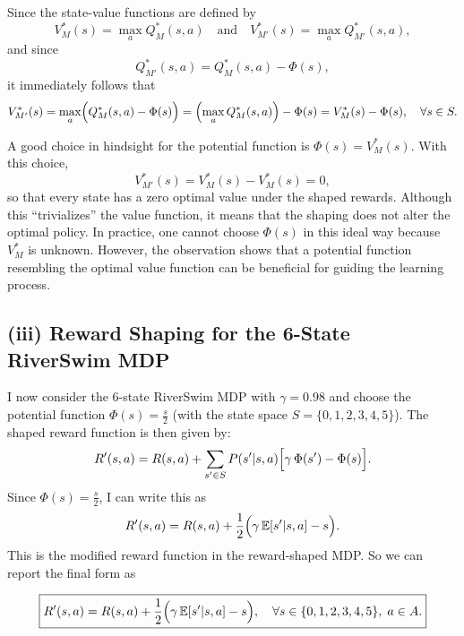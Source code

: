 Since the state-value functions are defined by
\[
V^*_M(s)=\max_{a} Q^*_M(s,a)
\quad \text{and} \quad 
V^*_{M'}(s)=\max_{a} Q^*_{M'}(s,a),
\]
and since
\[
Q^*_{M'}(s,a)=Q^*_M(s,a)-\Phi(s),
\]
it immediately follows that
\[
V^*_{M'}(s)=\max_{a}\Bigl(Q^*_M(s,a)-\Phi(s)\Bigr)
= \Bigl(\max_{a} Q^*_M(s,a)\Bigr)-\Phi(s)
= V^*_M(s)-\Phi(s),\quad \forall s\in S.
\]

A good choice in hindsight for the potential function is \(\Phi(s)=V^*_M(s)\). With this choice,
\[
V^*_{M'}(s)=V^*_M(s)-V^*_M(s)=0,
\]
so that every state has a zero optimal value under the shaped rewards. Although this “trivializes” the value 
function, it means that the shaping does not alter the optimal policy. In practice, one cannot choose \(\Phi(s)\)
in this ideal way because \(V^*_M\) is unknown. However, the observation shows that a potential function resembling 
the optimal value function can be beneficial for guiding the learning process.

\subsection*{(iii) Reward Shaping for the 6-State RiverSwim MDP}

I now consider the 6-state RiverSwim MDP with \(\gamma=0.98\) and choose the potential function 
\(\Phi(s)=\frac{s}{2}\) (with the state space \(S=\{0,1,2,3,4,5\}\)). The shaped reward function is then given by:
\[
R'(s,a)=R(s,a)+\sum_{s'\in S}P(s'|s,a)\Bigl[\gamma\,\Phi(s')-\Phi(s)\Bigr].
\]
Since \(\Phi(s)=\frac{s}{2}\), I can write this as
\[
R'(s,a)= R(s,a)+ \frac{1}{2}\Bigl(\gamma\,\mathbb{E}[s'|s,a]- s\Bigr).
\]
This is the modified reward function in the reward-shaped MDP. So we can report the final form as

\[
\boxed{
R'(s,a)= R(s,a)+ \frac{1}{2}\Bigl(\gamma\,\mathbb{E}[s'|s,a]- s\Bigr), \quad \forall s\in \{0,1,2,3,4,5\},\; a\in A.
}
\]
